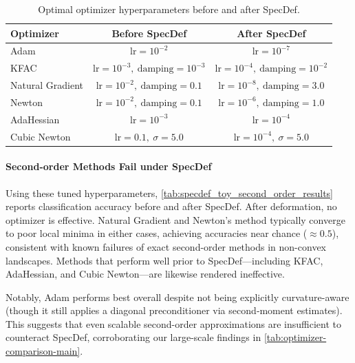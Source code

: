 \documentclass{article}
\theoremstyle{plain}
\theoremstyle{definition}
\theoremstyle{remark}
\begin{document}
\begin{table}[h]
\centering
\renewcommand{\arraystretch}{1.25}
\caption{Optimal optimizer hyperparameters before and after SpecDef.}
\label{tab:specdef_so_optimizer_hyperparams}
\begin{tabular}{lcc}
\hline
\textbf{Optimizer} & \textbf{Before SpecDef} & \textbf{After SpecDef} \\
\hline
Adam &
$\text{lr}=10^{-2}$ &
$\text{lr}=10^{-7}$ \\

KFAC &
$\text{lr}=10^{-3},\ \text{damping}=10^{-3}$ &
$\text{lr}=10^{-4},\ \text{damping}=10^{-2}$ \\

Natural Gradient &
$\text{lr}=10^{-2},\ \text{damping}=0.1$ &
$\text{lr}=10^{-8},\ \text{damping}=3.0$ \\

Newton &
$\text{lr}=10^{-2},\ \text{damping}=0.1$ &
$\text{lr}=10^{-6},\ \text{damping}=1.0$ \\

AdaHessian &
$\text{lr}=10^{-3}$ &
$\text{lr}=10^{-4}$ \\

Cubic Newton &
$\text{lr}=0.1,\ \sigma=5.0$ &
$\text{lr}=10^{-4},\ \sigma=5.0$ \\
\hline
\end{tabular}
\end{table}

\paragraph{Second-order Methods Fail under SpecDef}
Using these tuned hyperparameters, \cref{tab:specdef_toy_second_order_results} reports classification accuracy before and after SpecDef. After deformation, no optimizer is effective. Natural Gradient and Newton’s method typically converge to poor local minima in either cases, achieving accuracies near chance ($\approx 0.5$), consistent with known failures of exact second-order methods in non-convex landscapes. Methods that perform well prior to SpecDef—including KFAC, AdaHessian, and Cubic Newton—are likewise rendered ineffective.

Notably, Adam performs best overall despite not being explicitly curvature-aware (though it still applies a diagonal preconditioner via second‑moment estimates). This suggests that even scalable second-order approximations are insufficient to counteract SpecDef, corroborating our large-scale findings in \cref{tab:optimizer-comparison-main}.
\end{document}
